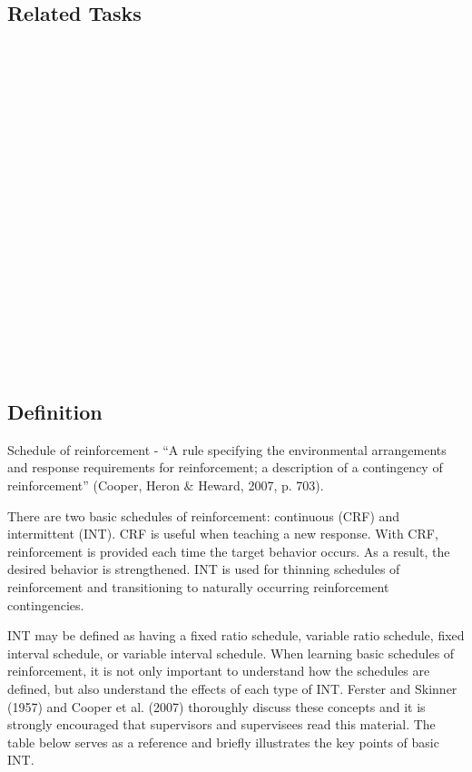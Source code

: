 \subsection{Related Tasks}
\fourcOne{}\\
\fourdTwo{}\\
\fourdSixteen{}\\
\fourdSeventeen{}\\
\fourdNineteen{}\\
\fourdTwenty{}\\
\fourdTwentyOne{}\\
\foureTen{}\\
\foureEleven{}\\
\fourfTwo{}\\
\fourFKFourteen{}\\
\fourFKFifteen{}\\
\fourFKSeventeen{}\\
\fourFKEighteen{}\\
\fourFKNineteen{}\\
\fourFKTwenty{}\\
\fourFKTwentyOne{}\\
\fourFKTwentyThree{}\\
%
%
%
%
%
%
%
\section[\fourdTwo{}]{\fourdTwo{}%
              }
\subsection{Definition}
Schedule of reinforcement - ``A rule specifying the environmental arrangements and response requirements for reinforcement; a description of a contingency of reinforcement'' (Cooper, Heron \& Heward, 2007, p. 703).

There are two basic schedules of reinforcement: continuous (CRF) and intermittent (INT). CRF is useful when teaching a new response. With CRF, reinforcement is provided each time the target behavior occurs. As a result, the desired behavior is strengthened. INT is used for thinning schedules of reinforcement and transitioning to naturally occurring reinforcement contingencies. 

INT may be defined as having a fixed ratio schedule, variable ratio schedule, fixed interval schedule, or variable interval schedule. When learning basic schedules of reinforcement, it is not only important to understand how the schedules are defined, but also understand the effects of each type of INT.  Ferster and Skinner (1957) and Cooper et al. (2007) thoroughly discuss these concepts and it is strongly encouraged that supervisors and supervisees read this material. The table below serves as a reference and briefly illustrates the key points of basic INT.
%
